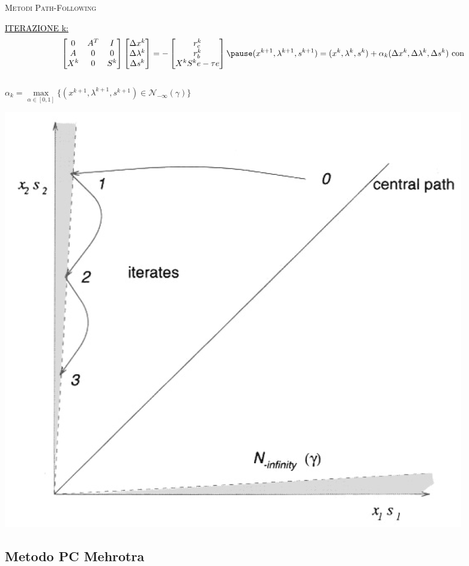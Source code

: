 
\begin{frame}[t]{\textsc{\LARGE \textcolor{burntumber}{Metodi Path-Following}}}
\begin{block}{\textcolor{black}{\underline{ITERAZIONE k:}}}
	\begin{equation*}	
	\begin{bmatrix}
	0&A^{T}&I \\A& 0&0\\X^{k}&0&S^{k}
	\end{bmatrix}\begin{bmatrix}
	\Delta x^{k}\\\Delta\lambda^{k} \\\Delta s^{k}
	\end{bmatrix}=-\begin{bmatrix}
	r_{c}^{k}\\r_{b}^{k}\\X^{k}S^{k}e-\tau e
	\end{bmatrix}\\
	\pause
	(x^{k+1}, \lambda^{k+1}, s^{k+1}) = (x^{k}, \lambda^{k}, s^{k})+ \alpha_{k}(\Delta x^{k}, \Delta\lambda^{k}, \Delta s^{k}) \text{ con}
	\end{equation*}\\
	$ \alpha_{k} = \max\limits_{\alpha \in[0,1]}\{(x^{k+1}, \lambda^{k+1}, s^{k+1})\in\mathcal{N}_{-\infty}(\gamma)\}$
\end{block}
\pause
\centering \includegraphics[width = 3.5 cm]{LPF.PNG}	
\end{frame}


\subsection{Metodo PC Mehrotra}

